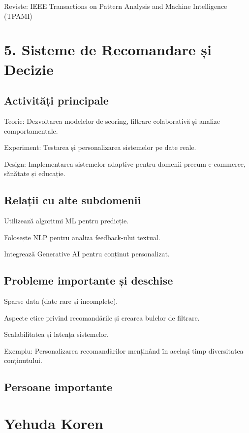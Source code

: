 \documentclass[12pt]{article}
\begin{document}
Reviste: IEEE Transactions on Pattern Analysis and Machine Intelligence (TPAMI)

\section{5. Sisteme de Recomandare și Decizie}

\subsection*{Activități principale}

Teorie: Dezvoltarea modelelor de scoring, filtrare colaborativă și analize comportamentale.

Experiment: Testarea și personalizarea sistemelor pe date reale.

Design: Implementarea sistemelor adaptive pentru domenii precum e-commerce, sănătate și educație.

\subsection*{Relații cu alte subdomenii}

Utilizează algoritmi ML pentru predicție.

Folosește NLP pentru analiza feedback-ului textual.

Integrează Generative AI pentru conținut personalizat.

\subsection*{Probleme importante și deschise}

Sparse data (date rare și incomplete).

Aspecte etice privind recomandările și crearea bulelor de filtrare.

Scalabilitatea și latența sistemelor.

Exemplu: Personalizarea recomandărilor menținând în același timp diversitatea conținutului.

\subsection*{Persoane importante}

\section*{Yehuda Koren}
\end{document}
